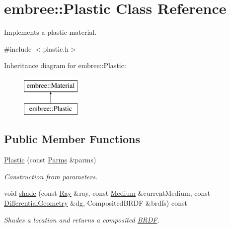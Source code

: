 \hypertarget{classembree_1_1_plastic}{
\section{embree::Plastic Class Reference}
\label{classembree_1_1_plastic}
}


Implements a plastic material.  




{\ttfamily \#include $<$plastic.h$>$}

Inheritance diagram for embree::Plastic:\begin{figure}[H]
\begin{center}
\leavevmode
\includegraphics[height=2.000000cm]{classembree_1_1_plastic}
\end{center}
\end{figure}
\subsection*{Public Member Functions}
\begin{DoxyCompactItemize}
\item 
\hyperlink{classembree_1_1_plastic_aadd07699a007b52fc035b9a9e7dd509c}{Plastic} (const \hyperlink{classembree_1_1_parms}{Parms} \&parms)
\begin{DoxyCompactList}\small\item\em Construction from parameters. \item\end{DoxyCompactList}\item 
void \hyperlink{classembree_1_1_plastic_a72224b06607ffda7d507003260ba2d47}{shade} (const \hyperlink{structembree_1_1_ray}{Ray} \&ray, const \hyperlink{classembree_1_1_medium}{Medium} \&currentMedium, const \hyperlink{structembree_1_1_differential_geometry}{DifferentialGeometry} \&dg, CompositedBRDF \&brdfs) const 
\begin{DoxyCompactList}\small\item\em Shades a location and returns a composited \hyperlink{classembree_1_1_b_r_d_f}{BRDF}. \item\end{DoxyCompactList}\end{DoxyCompactItemize}


